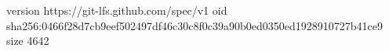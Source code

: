 version https://git-lfs.github.com/spec/v1
oid sha256:0466f28d7cb9eef502497df46c30c8f0c39a90b0ed0350ed1928910727b41ce9
size 4642
